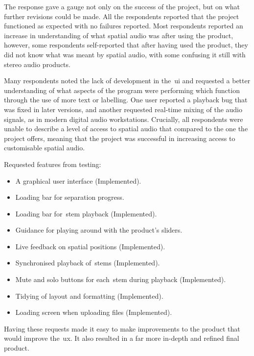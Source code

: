 The response gave a gauge not only on the success of the project, but on what further revisions could be made.
All the respondents reported that the project functioned as expected with no failures reported.
Most respondents reported an increase in understanding of what spatial audio was after using the product,
however, some respondents self-reported that after having used the product,
they did not know what was meant by spatial audio, with some confusing it still with stereo audio products.

Many respondents noted
the lack of development in the~\gls{ui} and requested a better understanding
of what aspects of the program were performing which function through the use of more text or labelling.
One user reported a playback bug that was fixed in later versions,
and another requested real-time mixing of the audio signals, as in modern digital audio workstations.
Crucially,
all respondents were unable
to describe a level of access to spatial audio that compared to the one the project offers,
meaning that the project was successful in increasing access to customisable spatial audio.

Requested features from testing:

\begin{itemize}
    \item A graphical user interface (Implemented).
    \item Loading bar for separation progress.
    \item Loading bar for~\gls{stem} playback (Implemented).
    \item Guidance for playing around with the product's sliders.
    \item Live feedback on spatial positions (Implemented).
    \item Synchronised playback of~\glspl{stem} (Implemented).
    \item Mute and solo buttons for each~\gls{stem} during playback (Implemented).
    \item Tidying of layout and formatting (Implemented).
    \item Loading screen when uploading files (Implemented).
\end{itemize}

Having these requests made it easy to make improvements to the product that would improve the~\gls{ux}.
It also resulted in a far more in-depth and refined final product.
